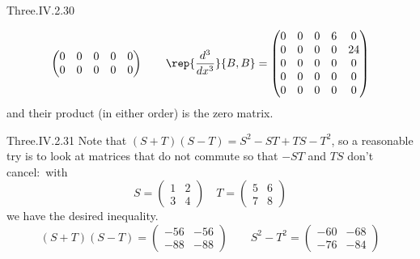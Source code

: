 \begin{ans}{Three.IV.2.30}
\begin{exparts}
\begin{equation*}
\begin{pmatrix}
              0  &0  &0  &0  &0  \\
              0  &0  &0  &0  &0
            \end{pmatrix}
            \qquad
            \rep{\frac{d^3}{dx^3}}{B,B}=\begin{pmatrix}
              0  &0  &0  &6  &0  \\
              0  &0  &0  &0  &24 \\
              0  &0  &0  &0  &0  \\
              0  &0  &0  &0  &0  \\
              0  &0  &0  &0  &0
            \end{pmatrix}
          \end{equation*}
          and their product (in either order) is the zero matrix.
      \end{exparts}
    
\end{ans}
\begin{ans}{Three.IV.2.31}
      Note that \( (S+T)(S-T)=S^2-ST+TS-T^2 \), so a reasonable try is to look
      at matrices that do not commute so that $-ST$ and $TS$ don't
      cancel:~with
      \begin{equation*}
        S=\begin{pmatrix}
            1  &2  \\
            3  &4
          \end{pmatrix}
        \quad
        T=\begin{pmatrix}
            5  &6  \\
            7  &8
          \end{pmatrix}
      \end{equation*}
      we have the desired inequality.
      \begin{equation*}
        (S+T)(S-T)=\begin{pmatrix}
            -56  &-56  \\
            -88  &-88
          \end{pmatrix}
        \qquad
        S^2-T^2=\begin{pmatrix}
            -60  &-68  \\
            -76  &-84
          \end{pmatrix}
      \end{equation*}
    
\end{ans}
